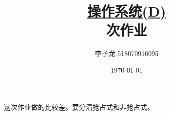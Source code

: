 \documentclass[12pt,a4paper]{article}
\newenvironment{problems}{\begin{list}{}{\renewcommand{\makelabel}[1]{\textbf{##1}\hfil}}}{\end{list}}
\newenvironment{steps}{\begin{list}{}{\renewcommand{\makelabel}[1]{##1.\hfil}}}{\end{list}}
\providecommand{\sol}{\textbf{解}.~}
\newcommand{\allpart}{20}
\providecommand{\blk}[2]{\framebox[\fpeval{round(#2/\allpart*\textwidth*0.8,2)}pt]{$P_#1$}}
\begin{document}
\title{\normalsize \underline{操作系统(D)}\\ 次作业}
\author{李子龙 518070910095}
\date{\today}
\maketitle

这次作业做的比较差。要分清抢占式和非抢占式。





             
\end{document}
